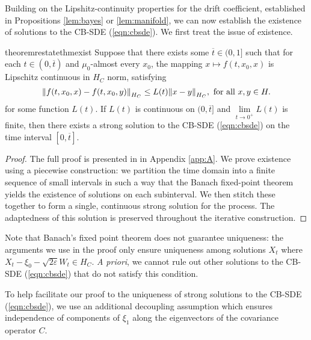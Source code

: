 Building on  the  Lipshitz-continuity properties for the drift coefficient, established in Propositions \ref{lem:bayes} or \ref{lem:manifold}, we can now establish the existence of solutions to the CB-SDE (\ref{eqn:cbsde}). We first treat the issue of existence.
\begin{theorembox}
  \begin{restatable}{theorem}{restatethmexist} \label{thm:exist}
    Suppose that there exists some \(\overline{t} \in (0, 1]\) such that for each \(t \in (0, \overline{t})\) and \(\mu_{0}\)-almost every \(x_{0}\), the mapping \(x \mapsto f(t, x_{0}, x)\) is Lipschitz continuous in \(H_{C}\) norm, satisfying
    \[
      \norm{f(t, x_{0}, x) - f(t, x_{0}, y)}_{H_{C}} \leq L(t) \norm{x - y}_{H_{C}}, \text{ for all } x, y \in H.
    \]
    for some function \(L(t)\). If \(L(t)\) is continuous on \((0, \overline{t}]\) and \(\lim\limits_{t \to 0^{+}} L(t) \) is finite, then there exists a strong solution to the CB-SDE (\ref{eqn:cbsde}) on the time interval \([0, \overline{t}]\).
  \end{restatable}
\end{theorembox}
\begin{proof}
  The full proof is presented in  in Appendix \ref{app:A}. We prove existence using a piecewise construction: we partition the time domain into a finite sequence of small intervals in such a way that the Banach fixed-point theorem  yields the existence of solutions on each subinterval. We then stitch these together to form a single, continuous strong solution for the process. The adaptedness of this solution is preserved throughout the iterative construction.
\end{proof}

Note that Banach's fixed point theorem does not guarantee uniqueness: the arguments we use in the proof only ensure uniqueness among solutions \(X_{t}\) where \(X_{t} - \xi_{0} - \sqrt{2\varepsilon} W_{t} \in H_{C}\). \textit{A priori}, we cannot  rule out  other solutions to the CB-SDE (\ref{eqn:cbsde}) that do not satisfy this condition.

To help facilitate our proof to the uniqueness of strong solutions to the CB-SDE (\ref{eqn:cbsde}), we use an additional decoupling assumption which ensures independence of components of \(\xi_{1}\) along the eigenvectors of the covariance operator \(C\).

